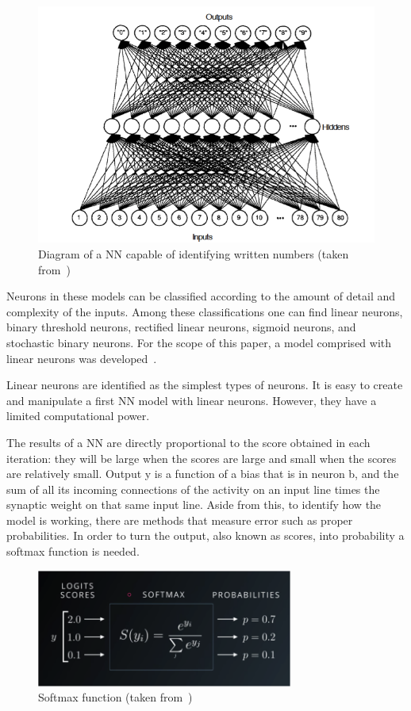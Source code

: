 \begin{figure}[htbp]
  \centering
  \includegraphics[width=\textwidth]{images/net}
  \caption{ Diagram of a \acl{NN} capable of identifying written numbers (taken from~\cite{freeman91}) }
  \label{fig:neuronNet}
\end{figure}

Neurons in these models can be classified according to the amount of detail and complexity of the 
inputs. Among these classifications one can find linear neurons, binary threshold neurons, rectified 
linear neurons, sigmoid neurons, and stochastic binary neurons. For the scope of this paper, a model 
comprised with linear neurons was developed~\cite{hinton13}. 

Linear neurons are identified as the simplest types of neurons. It is easy to create and manipulate a 
first \ac{NN} model with linear neurons. However,  they have a limited computational power.

The results of a \ac{NN} are directly proportional to the score obtained in each iteration: they will be 
large when the scores are large and small when the scores are relatively small. 
Output y is a function of a bias that is in neuron b, and the sum of all its incoming connections of the activity on an input line times the synaptic weight on that same input line. Aside from this, to identify how the model is working, there are methods that measure error such as proper probabilities. In order to turn the output, also known as scores, into probability a softmax function is needed.

\begin{figure}[htbp]
  \centering
  \includegraphics[width=0.75\textwidth]{images/softmax}
  \caption{ Softmax function (taken from~\cite{hinton13}) }
  \label{fig:softmax}
\end{figure}

